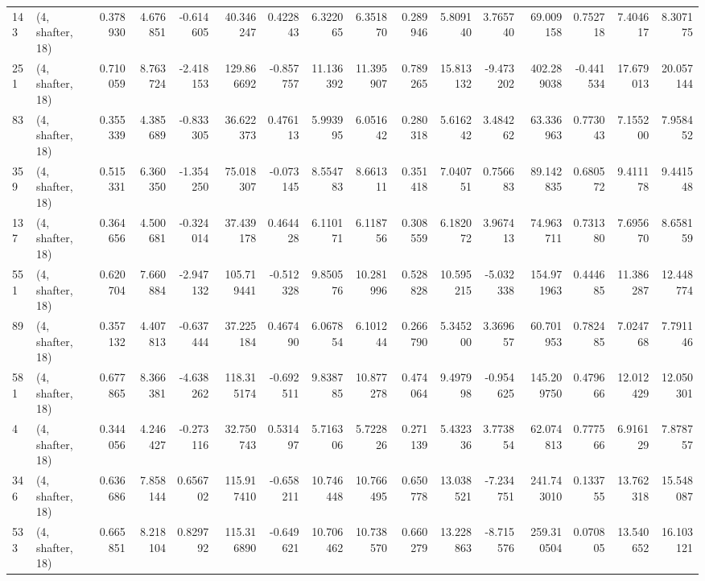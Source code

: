 \begin{tabular}{llrrrrrrrrrrrrrr}
143 &  (4, shafter, 18) &   0.378930 &   4.676851 &  -0.614605 &    40.346247 &   0.422843 &   6.322065 &   6.351870 &  0.289946 &   5.809140 &   3.765740 &    69.009158 &  0.752718 &   7.404617 &   8.307175 \\
251 &  (4, shafter, 18) &   0.710059 &   8.763724 &  -2.418153 &   129.866692 &  -0.857757 &  11.136392 &  11.395907 &  0.789265 &  15.813132 &  -9.473202 &   402.289038 & -0.441534 &  17.679013 &  20.057144 \\
83  &  (4, shafter, 18) &   0.355339 &   4.385689 &  -0.833305 &    36.622373 &   0.476113 &   5.993995 &   6.051642 &  0.280318 &   5.616242 &   3.484262 &    63.336963 &  0.773043 &   7.155200 &   7.958452 \\
359 &  (4, shafter, 18) &   0.515331 &   6.360350 &  -1.354250 &    75.018307 &  -0.073145 &   8.554783 &   8.661311 &  0.351418 &   7.040751 &   0.756683 &    89.142835 &  0.680572 &   9.411178 &   9.441548 \\
137 &  (4, shafter, 18) &   0.364656 &   4.500681 &  -0.324014 &    37.439178 &   0.464428 &   6.110171 &   6.118756 &  0.308559 &   6.182072 &   3.967413 &    74.963711 &  0.731380 &   7.695670 &   8.658159 \\
551 &  (4, shafter, 18) &   0.620704 &   7.660884 &  -2.947132 &   105.719441 &  -0.512328 &   9.850576 &  10.281996 &  0.528828 &  10.595215 &  -5.032338 &   154.971963 &  0.444685 &  11.386287 &  12.448774 \\
89  &  (4, shafter, 18) &   0.357132 &   4.407813 &  -0.637444 &    37.225184 &   0.467490 &   6.067854 &   6.101244 &  0.266790 &   5.345200 &   3.369657 &    60.701953 &  0.782485 &   7.024768 &   7.791146 \\
581 &  (4, shafter, 18) &   0.677865 &   8.366381 &  -4.638262 &   118.315174 &  -0.692511 &   9.838785 &  10.877278 &  0.474064 &   9.497998 &  -0.954625 &   145.209750 &  0.479666 &  12.012429 &  12.050301 \\
4   &  (4, shafter, 18) &   0.344056 &   4.246427 &  -0.273116 &    32.750743 &   0.531497 &   5.716306 &   5.722826 &  0.271139 &   5.432336 &   3.773854 &    62.074813 &  0.777566 &   6.916129 &   7.878757 \\
346 &  (4, shafter, 18) &   0.636686 &   7.858144 &   0.656702 &   115.917410 &  -0.658211 &  10.746448 &  10.766495 &  0.650778 &  13.038521 &  -7.234751 &   241.743010 &  0.133755 &  13.762318 &  15.548087 \\
533 &  (4, shafter, 18) &   0.665851 &   8.218104 &   0.829792 &   115.316890 &  -0.649621 &  10.706462 &  10.738570 &  0.660279 &  13.228863 &  -8.715576 &   259.310504 &  0.070805 &  13.540652 &  16.103121 \\

\end{tabular}
